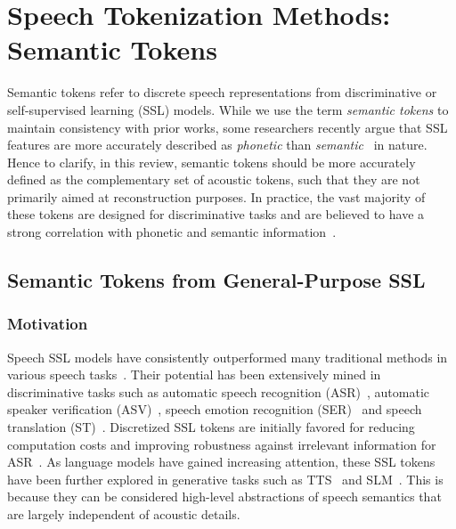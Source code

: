 
\section{Speech Tokenization Methods: Semantic Tokens}

\label{sec:semantic}
Semantic tokens refer to discrete speech representations from discriminative or self-supervised learning (SSL) models.
While we use the term \textit{semantic tokens} to maintain consistency with prior works, some researchers recently argue that SSL features are more accurately described as \textit{phonetic} than \textit{semantic}~\cite{choi24b_interspeech} in nature.
Hence to clarify, in this review, semantic tokens should be more accurately defined as the complementary set of acoustic tokens, such that they are not primarily aimed at reconstruction purposes.
In practice, the vast majority of these tokens are designed for discriminative tasks and are believed to have a strong correlation with phonetic and semantic information~\cite{wells22_interspeech,mohamed2022self,sicherman2023analysing,yeh2024estimating}.

\subsection{Semantic Tokens from General-Purpose SSL}
\label{sec:semantic-general}
\subsubsection{Motivation}
Speech SSL models have consistently outperformed many traditional methods in various speech tasks~\cite{superb,mohamed2022self}.
Their potential has been extensively mined in discriminative tasks such as automatic speech recognition (ASR)~\cite{wav2vec,vq-wav2vec,hsu2021hubert,zhang2020pushing}, automatic speaker verification (ASV)~\cite{chen2022wavlm,jung2024espnet,miara24_interspeech}, speech emotion recognition (SER)~\cite{morais2022speech,chen2022wavlm,MADANIAN2023200266,ma-etal-2024-emotion2vec} and speech translation (ST)~\cite{wu20g_interspeech,nguyen20_interspeech,babu22_interspeech}.
Discretized SSL tokens are initially favored for reducing computation costs and improving robustness against irrelevant information for ASR~\cite{chang23b_interspeech}.
As language models have gained increasing attention, these SSL tokens have been further explored in generative tasks such as TTS~\cite{VQTTS,kharitonov2023speak,vectokspeech} and SLM~\cite{lakhotia2021generative,borsos2023audiolm,hassid2024textually}.
This is because they can be considered high-level abstractions of speech semantics that are largely independent of acoustic details.

